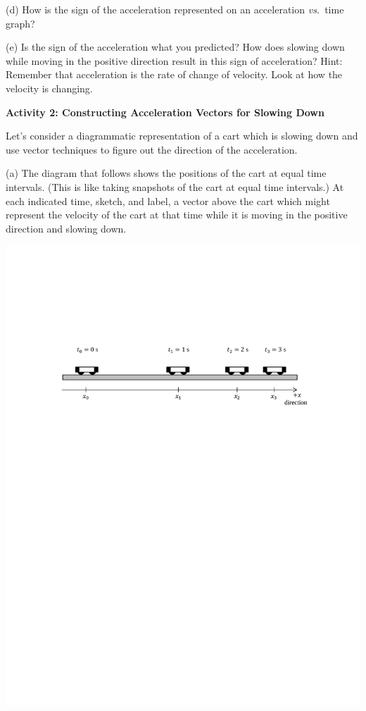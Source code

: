 (d) How is the sign of the acceleration represented on an acceleration \textit{vs.}~time
graph? 
\answerspace{15mm}

\pagebreak[3]
(e) Is the sign of the acceleration what you predicted? How does slowing down while moving in the positive direction result in this sign of acceleration? Hint: Remember that acceleration is the rate of change of velocity. Look at how the velocity is changing.
\answerspace{20mm}

\textbf{Activity 2: Constructing Acceleration Vectors for Slowing Down}

Let's consider a diagrammatic representation of a cart which is slowing down
and use vector techniques to figure out the direction of the acceleration.


(a) The diagram that follows shows the positions of the cart at equal time intervals.
(This is like taking snapshots of the cart at equal time intervals.) At each
indicated time, sketch, and label, a vector above the cart which might represent the velocity
of the cart at that time while it is moving in the positive direction and slowing down.

\vspace{0.5cm}
{\par\centering \includegraphics{slowing/carts_slowing.pdf} \par}
\vspace{0.5cm}

